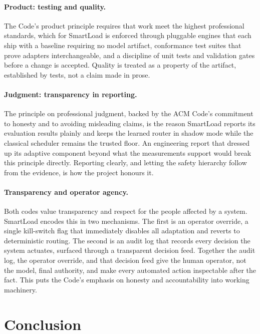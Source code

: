 \paragraph{Product: testing and quality.}
The Code's product principle requires that work meet the highest professional
standards, which for SmartLoad is enforced through pluggable engines that each
ship with a baseline requiring no model artifact, conformance test suites that
prove adapters interchangeable, and a discipline of unit tests and validation
gates before a change is accepted. Quality is treated as a property of the
artifact, established by tests, not a claim made in prose.

\paragraph{Judgment: transparency in reporting.}
The principle on professional judgment, backed by the ACM Code's commitment to
honesty and to avoiding misleading claims, is the reason SmartLoad reports its
evaluation results plainly and keeps the learned router in shadow mode while the
classical scheduler remains the trusted floor. An engineering report that
dressed up its adaptive component beyond what the measurements support would
break this principle directly. Reporting clearly, and letting the safety
hierarchy follow from the evidence, is how the project honours it.

\paragraph{Transparency and operator agency.}
Both codes value transparency and respect for the people affected by a system.
SmartLoad encodes this in two mechanisms. The first is an operator override, a
single kill-switch flag that immediately disables all adaptation and reverts to
deterministic routing. The second is an audit log that records every decision
the system actuates, surfaced through a transparent decision feed. Together the
audit log, the operator override, and that decision feed give the human
operator, not the model, final authority, and make every automated action
inspectable after the fact. This puts the Code's emphasis on honesty and
accountability into working machinery.

\section{Conclusion}
\label{lit:sec:conclusion}

